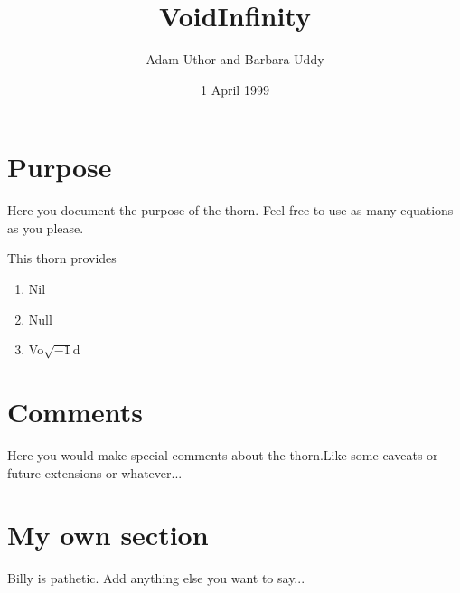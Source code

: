\documentclass{article}
\begin{document}
\title{VoidInfinity}
\author{Adam Uthor and Barbara Uddy}
\date{1 April 1999}
\maketitle


\section{Purpose}
Here you document the purpose of the thorn. Feel free to use
as many equations as you please. 

This thorn provides
 \begin{enumerate}
  \item Nil
  \item Null
  \item Vo$\sqrt{-1}$d
 \end{enumerate}

\section{Comments}
Here you would make special comments about the thorn.Like some caveats 
or future extensions or whatever...

\section{My own section}
Billy is pathetic. Add anything else you want to say...





\end{document}
